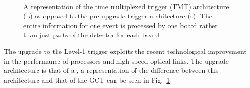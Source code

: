 \begin{figure}[!t]
  \centering
  ~ 
   \\
  \caption{A representation of the time multiplexed trigger (TMT)
  architecture (b) as opposed to the pre-upgrade trigger architecture
  (a). The entire information for one event is processed by one board
  rather than just parts of the detector for each board \cite{1748-0221-9-10-C10034}}
  \label{fig:tmt}
\end{figure}

The upgrade to the Level-1 trigger exploits the recent technological
improvement in the performance of \FPGA processors and high-speed
optical links. The upgrade architecture is that of a \TMT, a 
representation of the difference between this architecture and that of
the \ac{GCT} can be seen in Fig.~\ref{fig:tmt}

